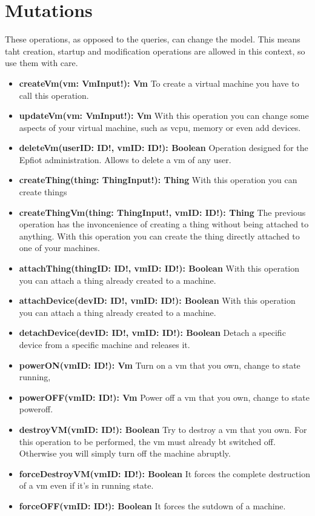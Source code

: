 \newpage
\section{Mutations}
\label{makereference5.3}
These operations, as opposed to the queries, can change the model. This means taht creation, startup and modification operations are allowed in this context, so use them with care.

\begin{itemize}
    \item \textbf{createVm(vm: VmInput!): Vm}\hfill\break
    To create a virtual machine you have to call this operation.
    \item \textbf{updateVm(vm: VmInput!): Vm}\hfill\break
    With this operation you can change some aspects of your virtual machine, such as vcpu, memory or even add devices.
    \item \textbf{deleteVm(userID: ID!, vmID: ID!): Boolean}\hfill\break
    Operation designed for the Epfiot administration. Allows to delete a vm of any user.
    \item \textbf{createThing(thing: ThingInput!): Thing}\hfill\break
    With this operation you can create things
    \item \textbf{createThingVm(thing: ThingInput!, vmID: ID!): Thing}\hfill\break
    The previous operation has the invoncenience of creating a thing without being attached to anything. With this operation you can create the thing directly attached to one of your machines.
    \item \textbf{attachThing(thingID: ID!, vmID: ID!): Boolean}\hfill\break
    With this operation you can attach a thing already created to a machine.
    \item \textbf{attachDevice(devID: ID!, vmID: ID!): Boolean}\hfill\break
    With this operation you can attach a thing already created to a machine.
    \item \textbf{detachDevice(devID: ID!, vmID: ID!): Boolean}\hfill\break
    Detach a specific device from a specific machine and releases it.
    \item \textbf{powerON(vmID: ID!): Vm}\hfill\break
    Turn on a vm that you own, change to state running,
    \item \textbf{powerOFF(vmID: ID!): Vm}\hfill\break
    Power off a vm that you own, change to state poweroff.
    \item \textbf{destroyVM(vmID: ID!): Boolean}\hfill\break
    Try to destroy a vm that you own. For this operation to be performed, the vm must already bt switched off. Otherwise you will simply turn off the machine abruptly.
    \item \textbf{forceDestroyVM(vmID: ID!): Boolean}\hfill\break
    It forces the complete destruction of a vm even if it's in running state.
    \item \textbf{forceOFF(vmID: ID!): Boolean}\hfill\break
    It forces the sutdown of a machine.
    
\end{itemize}